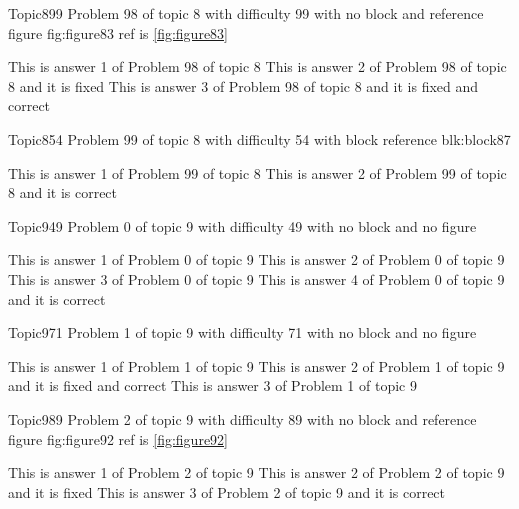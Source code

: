 \documentclass[master]{exam}
\begin{document}
\begin{problem}{Topic8}{99}
	Problem 98 of topic 8 with difficulty 99 with no block and reference figure fig:figure83 ref is \ref{fig:figure83}
	\begin{answers}
		\answer This is answer 1 of Problem 98 of topic 8 
		\answer[fixed] This is answer 2 of Problem 98 of topic 8 and it is fixed
		 This is answer 3 of Problem 98 of topic 8 and it is fixed and correct
	\end{answers}
\end{problem}

\begin{problem}[requires=blk:block87]{Topic8}{54}
	Problem 99 of topic 8 with difficulty 54 with block reference blk:block87
	\begin{answers}
		\answer This is answer 1 of Problem 99 of topic 8 
		\answer[correct] This is answer 2 of Problem 99 of topic 8 and it is correct
	\end{answers}
\end{problem}

\begin{problem}{Topic9}{49}
	Problem 0 of topic 9 with difficulty 49 with no block and no figure
	\begin{answers}
		\answer This is answer 1 of Problem 0 of topic 9 
		\answer This is answer 2 of Problem 0 of topic 9 
		\answer This is answer 3 of Problem 0 of topic 9 
		\answer[correct] This is answer 4 of Problem 0 of topic 9 and it is correct
	\end{answers}
\end{problem}

\begin{problem}{Topic9}{71}
	Problem 1 of topic 9 with difficulty 71 with no block and no figure
	\begin{answers}
		\answer This is answer 1 of Problem 1 of topic 9 
		 This is answer 2 of Problem 1 of topic 9 and it is fixed and correct
		\answer This is answer 3 of Problem 1 of topic 9 
	\end{answers}
\end{problem}

\begin{problem}{Topic9}{89}
	Problem 2 of topic 9 with difficulty 89 with no block and reference figure fig:figure92 ref is \ref{fig:figure92}
	\begin{answers}
		\answer This is answer 1 of Problem 2 of topic 9 
		\answer[fixed] This is answer 2 of Problem 2 of topic 9 and it is fixed
		\answer[correct] This is answer 3 of Problem 2 of topic 9 and it is correct
	\end{answers}
\end{problem}
\end{document}
